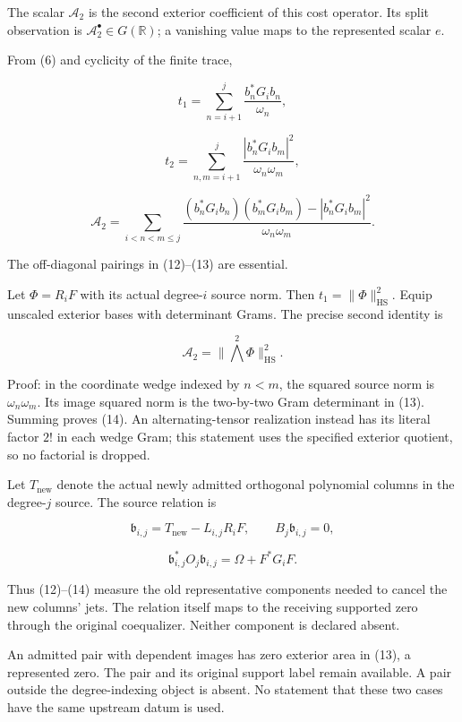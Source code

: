 The scalar \(\mathcal A_2\) is the second exterior coefficient of this cost operator. Its split observation is \(\mathcal A_2^\bullet\in G(\mathbb R)\); a vanishing value maps to the represented scalar \(e\).

From (6) and cyclicity of the finite trace,

\[
 \boxed{t_1=\sum_{n=i+1}^{j}\frac{b_n^*G_ib_n}{\omega_n},}
\]

\[
 \boxed{t_2=\sum_{n,m=i+1}^{j}
 \frac{|b_n^*G_ib_m|^2}{\omega_n\omega_m},}                      \tag{12}
\]

\[
 \boxed{\mathcal A_2=\sum_{i<n<m\le j}
 \frac{(b_n^*G_ib_n)(b_m^*G_ib_m)-|b_n^*G_ib_m|^2}
 {\omega_n\omega_m}.}                                          \tag{13}
\]

The off-diagonal pairings in (12)--(13) are essential.

Let \(\Phi=R_iF\) with its actual degree-\(i\) source norm. Then \(t_1=\|\Phi\|_{\mathrm{HS}}^2\). Equip unscaled exterior bases with determinant Grams. The precise second identity is

\[
 \boxed{\mathcal A_2=\|\bigwedge^2\Phi\|_{\mathrm{HS}}^2.}               \tag{14}
\]

Proof: in the coordinate wedge indexed by \(n<m\), the squared source norm is \(\omega_n\omega_m\). Its image squared norm is the two-by-two Gram determinant in (13). Summing proves (14). An alternating-tensor realization instead has its literal factor \(2!\) in each wedge Gram; this statement uses the specified exterior quotient, so no factorial is dropped.

Let \(T_{\mathrm{new}}\) denote the actual newly admitted orthogonal polynomial columns in the degree-\(j\) source. The source relation is

\[
 \mathfrak b_{i,j}=T_{\mathrm{new}}-L_{i,j}R_iF,
 \qquad
 B_j\mathfrak b_{i,j}=0,
\]

\[
 \boxed{\mathfrak b_{i,j}^*O_j\mathfrak b_{i,j}
 =\Omega+F^*G_iF.}                                             \tag{15}
\]

Thus (12)--(14) measure the old representative components needed to cancel the new columns' jets. The relation itself maps to the receiving supported zero through the original coequalizer. Neither component is declared absent.

An admitted pair with dependent images has zero exterior area in (13), a represented zero. The pair and its original support label remain available. A pair outside the degree-indexing object is absent. No statement that these two cases have the same upstream datum is used.

